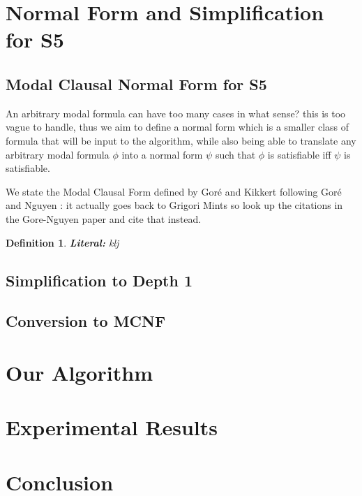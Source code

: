 \documentclass{article}
\newtheorem{definition}{Definition}[section]
\newcommand{\raj}[1]{{\color{blue}#1\color{black}}}
\begin{document}
\section{Normal Form and Simplification for S5}
%

\subsection{Modal Clausal Normal Form for S5}

An arbitrary modal formula can have too many cases \raj{in what sense? this is too vague} to handle, thus we aim to define a normal form which is a smaller class of formula that will be input to the algorithm, while also being able to translate any arbitrary modal formula $\phi $ into a normal form $\psi$ such that $\phi$ is satisfiable iff $\psi$ is satisfiable.

We state the Modal Clausal Form defined by Gor\'e and Kikkert \cite{GoreKikkert21} following Gor\'e and Nguyen \cite{Gorenguyen2009}:
\raj{it actually goes back to Grigori Mints so look up the citations in the Gore-Nguyen paper and cite that instead.}

\begin{definition}
    \textbf{Literal: } klj
\end{definition}
\subsection{Simplification to Depth 1}
\subsection{Conversion to MCNF}


\section{Our Algorithm}
%


\section{Experimental Results}
%


\section{Conclusion}
%
\end{document}
